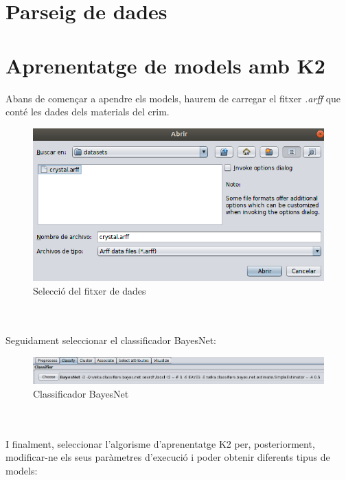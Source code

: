 \documentclass[11pt,a4paper]{article}
\begin{document}
\vspace*{0.2in}

\listoffigures

\newpage

\part{Parseig de dades}

\newpage

\part{Aprenentatge de models amb K2}
Abans de començar a apendre els models, haurem de carregar el fitxer \textit{.arff} que conté les dades dels materials del crim.\\
\begin{figure}[hbtp]
\centering
\includegraphics[scale=0.4]{Figures/1.png}
\caption{Selecció del fitxer de dades }
\end{figure}
\\\\
Seguidament seleccionar el classificador BayesNet:\\
\begin{figure}[hbtp]
\centering
\includegraphics[scale=0.5]{Figures/2.png}
\caption{Classificador BayesNet}
\end{figure}
\\\\
I finalment, seleccionar l'algorisme d'aprenentatge K2 per, posteriorment, modificar-ne els seus paràmetres d'execució i poder obtenir diferents tipus de models:\\
\end{document}
